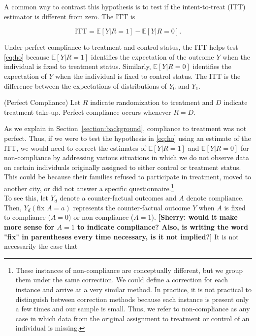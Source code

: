 \noindent A common way to contrast this hypothesis is to test if the intent-to-treat (ITT) estimator is different from zero. The ITT is 

\begin{equation}
\text{ITT} = \mathbb{E} \left[ Y | R = 1 \right] - \mathbb{E} \left[ Y | R = 0 \right]. \label{eq:itt}
\end{equation} 

\noindent Under perfect compliance to treatment and control status, the ITT helps test \eqref{eq:ho} because $\mathbb{E} \left[ Y | R = 1 \right]$ identifies the expectation of the outcome $Y$ when the individual is fixed to treatment status. Similarly, $\mathbb{E} \left[ Y | R = 0 \right]$ identifies the expectation of $Y$ when the individual is fixed to control status. The ITT is the difference between the expectations of distributions of $Y_{0}$ and $Y_{1}$.

\noindent \begin{assumption} \normalfont (Perfect Compliance) Let $R$ indicate randomization to treatment and $D$ indicate treatment take-up. Perfect compliance occurs whenever  $R = D$.\end{assumption}

\noindent As we explain in Section~\ref{section:background}, compliance to treatment was not perfect. Thus, if we were to test the hypothesis in \eqref{eq:ho} using an estimate of the ITT, we would need to correct the estimates of $\mathbb{E} \left[ Y | R = 1 \right]$ and $\mathbb{E} \left[ Y | R = 0 \right]$ for non-compliance by addressing various situations in which we do not observe data on certain individuals originally assigned to either control or treatment status. This could be because their families refused to participate in treatment, moved to another city, or did not answer a specific questionnaire.\footnote{These instances of non-compliance are conceptually different, but we group them under the same correction. We could define a correction for each instance and arrive at a very similar method. In practice, it is not practical to distinguish between correction methods because each instance is present only a few times and our sample is small. Thus, we refer to non-compliance as any case in which data from the original assignment to treatment or control of an individual is missing.} \\

To see this, let $Y_d$ denote a counter-factual outcomes and $A$ denote compliance. Then, $Y_{d} \left(\text{fix } A = a \right)$ represents the counter-factual outcome $Y$ when $A$ is fixed to compliance ($A = 0$) or non-compliance ($A = 1$). \textbf{[Sherry: would it make more sense for $A=1$ to indicate compliance? Also, is writing the word "fix" in parentheses every time necessary, is it not implied?]} It is not necessarily the case that 

